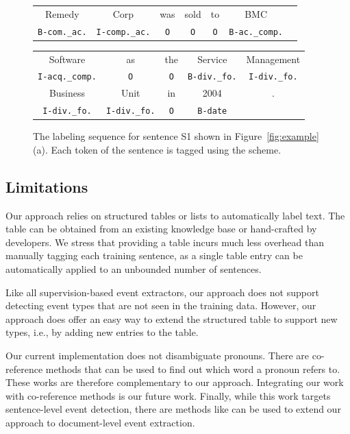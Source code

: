 \begin{figure}[t!]
\centering
\scriptsize
\begin{tabular}{ccccccc}
\toprule
Remedy & Corp & was & sold & to & BMC & \\
\rowcolor{Gray} \texttt{B-com.\_ac.} & \texttt{I-comp.\_ac.} & \texttt{O} & \texttt{O} & \texttt{O} & \texttt{B-ac.\_comp.} &\\
\end{tabular}
\begin{tabular}{ccccc}
Software & as & the & Service &Management \\
\rowcolor{Gray} \texttt{I-acq.\_comp.} & \texttt{O} & \texttt{O} & \texttt{B-div.\_fo.} & \texttt{I-div.\_fo.} \\
Business & Unit & in & 2004 &.\\
\rowcolor{Gray} \texttt{I-div.\_fo.} & \texttt{I-div.\_fo.} & \texttt{O} & \texttt{B-date} &\\
\bottomrule
\end{tabular}

\caption{The labeling sequence for sentence S1 shown in Figure~\ref{fig:example} (a). Each token of the sentence is tagged using the \BIO
scheme. \label{fig:ls}}
\end{figure}

\subsection{Limitations}
Our approach relies on structured tables or lists to automatically label text. The table can be obtained from an existing knowledge base or
hand-crafted by developers. We stress that providing a table incurs much less overhead than manually tagging each training sentence, as a
single table entry can be automatically applied to an unbounded number of sentences.

Like all supervision-based event extractors, our approach does not support detecting event types that are not seen in the training data.
However, our approach does offer an easy way to extend the structured table to support new types, i.e., by adding new entries to the table.


Our current implementation does not disambiguate pronouns. There are co-reference methods\FIXME{~\cite{}} that can be used to find out
which word a pronoun refers to. These works are therefore complementary to our approach. Integrating our work with co-reference methods is
our future work. Finally, while this work targets sentence-level event detection, there are methods like \FIXME{\cite{}} can be used to
extend our approach to document-level event extraction.
